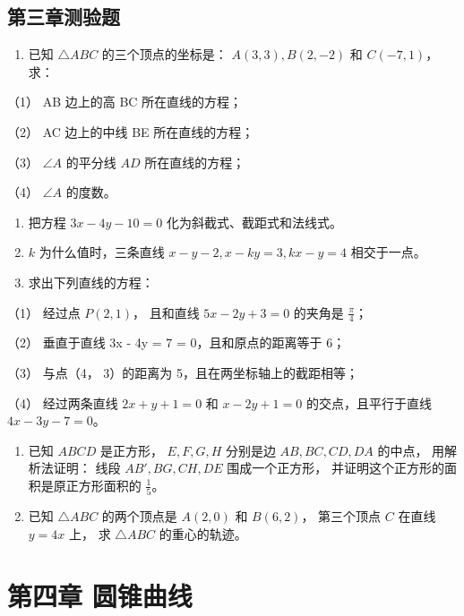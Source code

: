 \section{第三章测验题}\label{ux7b2cux4e09ux7ae0ux6d4bux9a8cux9898}

\begin{enumerate}
\def\labelenumi{\arabic{enumi}.}
\tightlist
\item
  已知 \(\triangle ABC\) 的三个顶点的坐标是： \(A(3,3), B(2,-2)\) 和
  \(C(-7,1)\)， 求：
\end{enumerate}

（1） AB 边上的高 BC 所在直线的方程；

（2） AC 边上的中线 BE 所在直线的方程；

（3） \(\angle A\) 的平分线 \(AD\) 所在直线的方程；

（4） \(\angle A\) 的度数。

\begin{enumerate}
\def\labelenumi{\arabic{enumi}.}
\setcounter{enumi}{1}
\item
  把方程 \(3x - 4y - 10 = 0\) 化为斜截式、截距式和法线式。
\item
  \(k\) 为什么值时，三条直线 \(x - y - 2, x - ky = 3, kx - y = 4\)
  相交于一点。
\item
  求出下列直线的方程：
\end{enumerate}

（1） 经过点 \(P(2, 1)\)， 且和直线 \(5x - 2y + 3 = 0\) 的夹角是
\(\frac{\pi}{4}\)；

（2） 垂直于直线 3x - 4y = 7 = 0，且和原点的距离等于 6；

（3） 与点（4， 3）的距离为 5，且在两坐标轴上的截距相等；

（4） 经过两条直线 \(2x + y + 1 = 0\) 和 \(x - 2y + 1 = 0\)
的交点，且平行于直线 \(4x - 3y - 7 = 0\)。

\begin{enumerate}
\def\labelenumi{\arabic{enumi}.}
\setcounter{enumi}{4}
\item
  已知 \(ABCD\) 是正方形， \(E, F, G, H\) 分别是边 \(AB, BC, CD, DA\)
  的中点， 用解析法证明： 线段 \(AB', BG, CH, DE\) 围成一个正方形，
  并证明这个正方形的面积是原正方形面积的 \(\frac{1}{5}\)。
\item
  已知 \(\triangle ABC\) 的两个顶点是 \(A(2,0)\) 和 \(B(6,2)\)，
  第三个顶点 \(C\) 在直线 \(y = 4x\) 上， 求 \(\triangle ABC\)
  的重心的轨迹。
\end{enumerate}

\chapter{第四章
圆锥曲线}\label{ux7b2cux56dbux7ae0-ux5706ux9525ux66f2ux7ebf}

